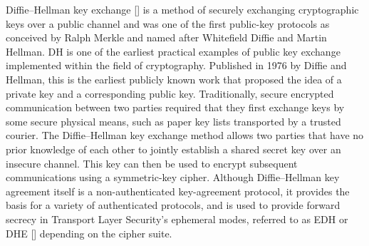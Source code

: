 Diffie–Hellman key exchange [\cite{li2010research}] is a method of securely exchanging cryptographic keys over a public channel
and was one of the first public-key protocols
as conceived by Ralph Merkle and named after Whitefield Diffie and Martin Hellman.
DH is one of the earliest practical examples of public key exchange implemented within the field of cryptography.
Published in 1976 by Diffie and Hellman, this is the earliest publicly known work that proposed the idea of a private
key and a corresponding public key.
Traditionally, secure encrypted communication between two parties required that they first exchange keys by some secure physical means,
such as paper key lists transported by a trusted courier.
The Diffie–Hellman key exchange method allows two parties that have no prior knowledge of
each other to jointly establish a shared secret key over an insecure channel.
This key can then be used to encrypt subsequent communications using a symmetric-key cipher.
Although Diffie–Hellman key agreement itself is a non-authenticated key-agreement protocol, it provides the basis for a
variety of authenticated protocols, and is used to provide forward secrecy in Transport Layer Security's ephemeral modes,
referred to as EDH or DHE [\cite{ahirwal2013elliptic}] depending on the cipher suite.

